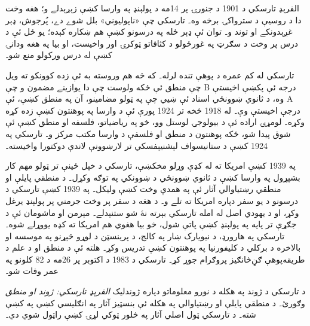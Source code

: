 \documentclass[../../../include/open-logic-section]{subfiles}
\begin{document}



الفرېډ تارسکي د 1901 د جنورۍ پر 14مه
د پولېنډ په وارسا کښې زېږېدلے و؛
هغه وخت دا د روسيې د سترواکۍ برخه
وه۔ تارسکي چې «ناپوليوني» بلل شوے
دے، پُرجوش، ډېر غږېدونکے او توند
و۔ توان ئې ډېر ځله په درسونو کښې
هم ښکاره کېده؛ يو ځل ئې د درس
پر وخت د سګرټ په غورځولو د کثافاتو
ټوکرۍ اور واخيست، او بيا په هغه
ودانۍ کښې له درس ورکولو منع شو۔

تارسکي له کم عمره د پوهې تنده لرله۔
که څه هم وروسته به ئې زده کوونکو
ته ويل چې منطق ئې ځکه ولوست چې
دا يوازينے مضمون و چې B درجه ئې
پکښې اخيستې وه، د ثانوي ښوونځي
اسناد ئې ښيي چې په ټولو مضامينو،
آن په منطق کښې، ئې A درجې اخيستې
وې۔ له 1918 څخه تر 1924 پورې
ئې د وارسا په پوهنتون کښې زده
کړه وکړه۔ لومړۍ اراده ئې د
بيولوجۍ لوستل وو، خو په رياضياتو،
فلسفه او منطق کښې ئې شوق پيدا
شو، ځکه پوهنتون د منطق او فلسفې
د وارسا مکتب مرکز و۔ تارسکي په
1924 کښې د ستانيسواف لېشنيېفسکي
تر لارښوونې لاندې دوکتورا واخيسته۔

په 1939 کښې امريکا ته له کډې وړلو
مخکښې، تارسکي د خپل ځينې تر ټولو
مهم کار بشپړول په وارسا کښې د
ثانوي ښوونځي د ښوونکي په توګه
وکړل۔ د منطقي پايلې او منطقي
رښتياوالي آثار ئې په همدې وخت
کښې وليکل۔ په 1939 کښې تارسکي
د درسونو د يو سفر دپاره امريکا
ته تلے و۔ د هغه د سفر پر وخت
جرمني پر پولېنډ يرغل وکړ، او د
يهودي اصل له امله تارسکي بېرته
نۀ شو ستنېدلے۔ مېرمن او ماشومان
ئې د جګړې تر پايه په پولېنډ کښې
پاتې شول، خو بيا هغوي هم امريکا
ته کډه يووړلے شوه۔ تارسکي په
هارورډ، د نيويارک ښار په کالج،
د پرينسټن د لوړو څېړنو په موسسه
او بالاخره د برکلي د کليفورنيا
په پوهنتون کښې تدريس وکړ۔ هلته
ئې د منطق او د علم د طريقه‌پوهې
ګڼ‌څانګيز پروګرام جوړ کړ۔ تارسکي
د 1983 د اکتوبر پر 26مه د 82
کلونو په عمر وفات شو۔

\begin{reading}
د تارسکي د ژوند په هکله د نورو
معلوماتو دپاره ژوندليک \emph{الفرېډ
تارسکي: ژوند او منطق}
\citep{Feferman2004} وګورئ۔ د منطقي
پايلې او رښتياوالي په هکله ئې
بنسټيز آثار په انګليسي کښې په
\citep{Tarski1983} کښې شته۔ د
تارسکي ټول اصلي آثار په څلور
ټوکي لړۍ \citep{Tarski1981} کښې
راټول شوي دي۔
\end{reading}
\end{document}

